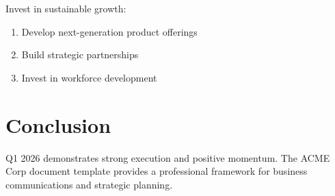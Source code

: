 \documentclass[11pt]{article}
\begin{document}
Invest in sustainable growth:
\begin{enumerate}
    \item Develop next-generation product offerings
    \item Build strategic partnerships
    \item Invest in workforce development
\end{enumerate}

\section{Conclusion}

Q1 2026 demonstrates strong execution and positive momentum. The ACME Corp document template provides a professional framework for business communications and strategic planning.

\nocite{*}
\printbibliography
\end{document}
